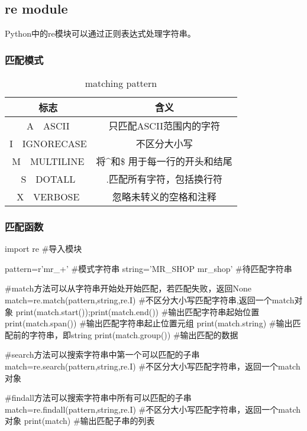 \documentclass{article}
\begin{document}
    \subsection{re module}
      Python中的re模块可以通过正则表达式处理字符串。
      \subsubsection{匹配模式}
        \begin{table}[H]
          \centering
          \caption{matching pattern}
          \label{tab:matching pattern}
          \begin{tabular}{cc}
            \toprule[1.5pt]
            标志 & 含义 \\
            \midrule
            A~~ASCII & 只匹配ASCII范围内的字符 \\
            I~~IGNORECASE & 不区分大小写 \\
            M~~MULTILINE & 将\^{}和\$ 用于每一行的开头和结尾 \\
            S~~DOTALL & .匹配所有字符，包括换行符 \\
            X~~VERBOSE & 忽略未转义的空格和注释 \\
            \bottomrule[1.5pt]
          \end{tabular}
        \end{table}

      \subsubsection{匹配函数}
        \begin{codeblock}[language=python, caption={string matching}]
          import re #导入模块

          pattern=r'mr_\w+' #模式字符串
          string='MR_SHOP mr_shop' #待匹配字符串

          #match方法可以从字符串开始处开始匹配，若匹配失败，返回None
          match=re.match(pattern,string,re.I) #不区分大小写匹配字符串,返回一个match对象
          print(match.start());print(match.end()) #输出匹配字符串起始位置
          print(match.span()) #输出匹配字符串起止位置元组
          print(match.string) #输出匹配前的字符串，即string
          print(match.group()) #输出匹配的数据

          #search方法可以搜索字符串中第一个可以匹配的子串
          match=re.search(pattern,string,re.I) #不区分大小写匹配字符串，返回一个match对象

          #findall方法可以搜索字符串中所有可以匹配的子串
          match=re.findall(pattern,string,re.I) #不区分大小写匹配字符串，返回一个match对象
          print(match) #输出匹配子串的列表
        \end{codeblock}
\end{document}

